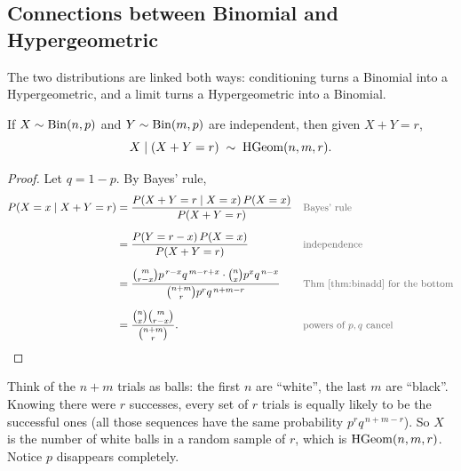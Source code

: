 \bigskip

\subsection{Connections between Binomial and Hypergeometric}\label{sec:binhgeom}

\bigskip

The two distributions are linked both ways: conditioning turns a Binomial into a Hypergeometric, and a limit turns a Hypergeometric into a Binomial.

\bigskip

\begin{theorem}\label{thm:bin2hgeom}
If $X \sim \operatorname{Bin}(n, p)$ and $Y \sim \operatorname{Bin}(m, p)$ are independent, then given $X + Y = r$,
\medskip
\[
X \mid (X + Y = r) \;\sim\; \operatorname{HGeom}(n, m, r).
\]
\end{theorem}

\medskip

\begin{proof}
Let $q = 1 - p$. By Bayes' rule,
\medskip
\begin{align*}
P(X = x \mid X + Y = r)
  &= \frac{P(X + Y = r \mid X = x)\,P(X = x)}{P(X + Y = r)}
  && \by{Bayes' rule} \\[0.6em]
  &= \frac{P(Y = r - x)\,P(X = x)}{P(X + Y = r)}
  && \by{independence} \\[0.6em]
  &= \frac{\binom{m}{r-x} p^{\,r-x} q^{\,m-r+x} \cdot \binom{n}{x} p^{x} q^{\,n-x}}{\binom{n+m}{r} p^{r} q^{\,n+m-r}}
  && \by{Thm~\ref{thm:binadd} for the bottom} \\[0.6em]
  &= \frac{\binom{n}{x}\binom{m}{r-x}}{\binom{n+m}{r}}.
  && \by{powers of $p, q$ cancel}
\end{align*}
\end{proof}

\bigskip

\begin{intuition}
Think of the $n + m$ trials as balls: the first $n$ are ``white'', the last $m$ are ``black''. Knowing there were $r$ successes, every set of $r$ trials is equally likely to be the successful ones (all those sequences have the same probability $p^{r}q^{\,n+m-r}$). So $X$ is the number of white balls in a random sample of $r$, which is $\operatorname{HGeom}(n, m, r)$. Notice $p$ disappears completely.
\end{intuition}

